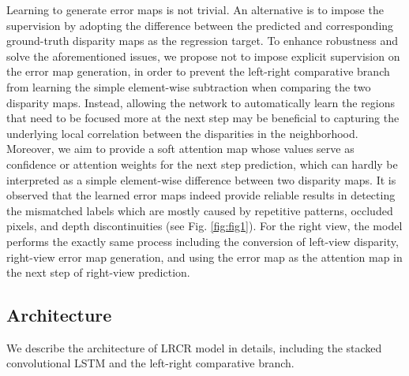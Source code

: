\documentclass[10pt,twocolumn,letterpaper]{article}
\DeclareMathOperator\argmin{arg\,min}
\begin{document}

Learning to generate error maps is not trivial. An alternative is to impose the supervision by adopting the difference between the predicted and corresponding ground-truth disparity maps as the regression target. To enhance robustness and solve the aforementioned issues,  we propose  not to  impose  explicit supervision on the error map generation, in order to prevent the left-right comparative branch from learning the simple element-wise subtraction when comparing the two disparity maps. Instead, allowing the network to automatically learn the regions that need to be focused more at the next step may be beneficial to capturing the underlying local correlation between the disparities in the neighborhood. Moreover, we aim to provide a soft attention map whose values serve as confidence or attention weights for the next step prediction, which can hardly be interpreted as a simple element-wise difference between two disparity maps. It is observed that the learned error maps indeed provide reliable results in detecting the mismatched labels which are mostly caused by repetitive patterns, occluded pixels, and depth discontinuities (see Fig. \ref{fig:fig1}). For the right view, the model performs the exactly same process including the conversion of left-view disparity, right-view error map generation, and using the error map as the attention map in the next step of right-view prediction.

\subsection{ Architecture}
We describe the architecture of LRCR model in details, including the stacked convolutional LSTM and the left-right comparative branch. 
\vspace{-0.3cm}
\end{document}
